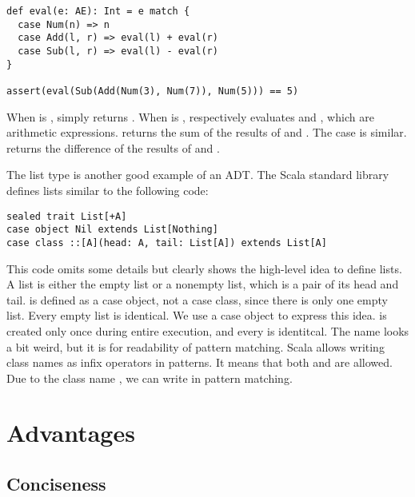 \begin{verbatim}
def eval(e: AE): Int = e match {
  case Num(n) => n
  case Add(l, r) => eval(l) + eval(r)
  case Sub(l, r) => eval(l) - eval(r)
}

assert(eval(Sub(Add(Num(3), Num(7)), Num(5))) == 5)
\end{verbatim}

When  is ,  simply returns .
When  is ,  respectively evaluates 
and , which are arithmetic expressions.  returns the sum of
the results of  and .
The  case is similar.  returns the difference of
the results of  and .

The list type is another good example of an ADT. The Scala standard library defines
lists similar to the following code:

\begin{verbatim}
sealed trait List[+A]
case object Nil extends List[Nothing]
case class ::[A](head: A, tail: List[A]) extends List[A]
\end{verbatim}

This code omits some details but clearly shows the high-level idea to define
lists.
A list is either the empty
list or a nonempty list, which is a pair of its head and tail.  is
defined as a case object, not a case class, since there is only one empty list.
Every empty list is identical. We use a case object to express this idea.
 is created only once during entire execution, and every  is
identitcal. The name \code{::} looks a bit weird, but it is for
readability of pattern matching. Scala allows writing class names as infix
operators in patterns. It means that both  and  are allowed. Due to the class name \code{::}, we can write  in pattern matching.

\section{Advantages}

\subsection{Conciseness}

